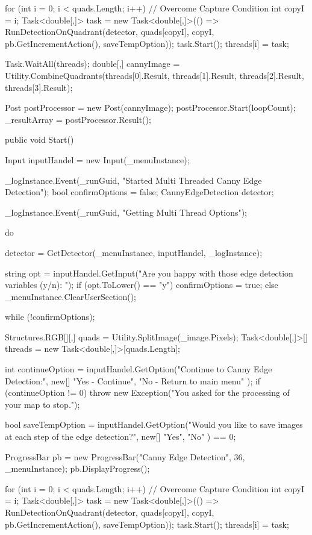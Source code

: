\begin{flushleft}
\begin{cscode}
{{        for (int i = 0; i < quads.Length; i++)
        {
            // Overcome Capture Condition
            int copyI = i;
            Task<double[,]> task = new Task<double[,]>(() => RunDetectionOnQuadrant(detector, quads[copyI], copyI, pb.GetIncrementAction(), saveTempOption));
            task.Start();
            threads[i] = task;
        }

        Task.WaitAll(threads);
        double[,] cannyImage = Utility.CombineQuadrants(threads[0].Result, threads[1].Result, threads[2].Result,
        threads[3].Result);

        Post postProcessor = new Post(cannyImage);
        postProcessor.Start(loopCount);
        _resultArray = postProcessor.Result();
    }

    public void Start()
    {
        Input inputHandel = new Input(_menuInstance);

        _logInstance.Event(_runGuid, "Started Multi Threaded Canny Edge Detection");
        bool confirmOptions = false;
        CannyEdgeDetection detector;

        _logInstance.Event(_runGuid, "Getting Multi Thread Options");

        do
        {
            detector = GetDetector(_menuInstance, inputHandel, _logInstance);

            string opt = inputHandel.GetInput("Are you happy with those edge detection variables (y/n): ");
            if (opt.ToLower() == "y") confirmOptions = true;
            else _menuInstance.ClearUserSection();
        } while (!confirmOptions);


        Structures.RGB[][,] quads = Utility.SplitImage(_image.Pixels);
        Task<double[,]>[] threads = new Task<double[,]>[quads.Length];

        int continueOption = inputHandel.GetOption("Continue to Canny Edge Detection:", new[] { "Yes - Continue", "No - Return to main menu" });
        if (continueOption != 0) throw new Exception("You asked for the processing of your map to stop.");

        bool saveTempOption = inputHandel.GetOption("Would you like to save images at each step of the edge detection?", new[] { "Yes", "No" }) == 0;

        ProgressBar pb = new ProgressBar("Canny Edge Detection", 36, _menuInstance);
        pb.DisplayProgress();

        for (int i = 0; i < quads.Length; i++)
        {
            // Overcome Capture Condition
            int copyI = i;
            Task<double[,]> task = new Task<double[,]>(() => RunDetectionOnQuadrant(detector, quads[copyI], copyI, pb.GetIncrementAction(), saveTempOption));
            task.Start();
            threads[i] = task;
        }

}}
\end{cscode}
\end{flushleft}
